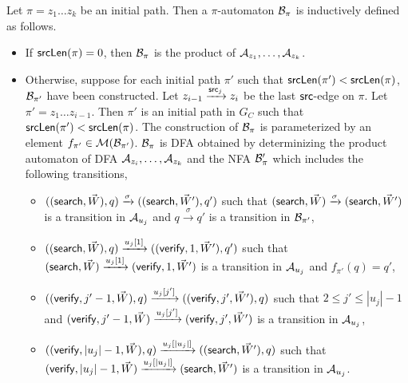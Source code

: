\documentclass{llncs}
\begin{document}
{\begin{definition}[$\pi$-automaton]\label{def-pi-aut}
Let $\pi=z_1 \dots z_k$ be an initial path.  Then a $\pi$-automaton $\mathcal{B}_\pi$ is inductively defined as follows.
\begin{itemize}
\item If $\mathsf{srcLen}(\pi)=0$, then $\mathcal{B}_\pi$ is the product of $\mathcal{A}_{z_1},\dots, \mathcal{A}_{z_k}$.
%
\item Otherwise, 
 suppose for each initial path $\pi'$ such that $\mathsf{srcLen}(\pi') < \mathsf{srcLen}(\pi)$, $\mathcal{B}_{\pi'}$ have been constructed.  
 Let $z_{i-1} \xrightarrow{\mathsf{src}_j} z_{i}$ be the last $\mathsf{src}$-edge on $\pi$. 
Let $\pi' = z_1\dots z_{i-1}$. Then $\pi'$ is an initial path in $G_C$ such that $\mathsf{srcLen}(\pi') < \mathsf{srcLen}(\pi)$. The construction of $\mathcal{B}_\pi$ is parameterized by an element $f_{\pi'} \in \mathcal{M}(\mathcal{B}_{\pi'})$. $\mathcal{B}_\pi$ is DFA obtained by determinizing the product automaton of DFA $\mathcal{A}_{z_i},\dots, \mathcal{A}_{z_k}$ and the NFA $\mathcal{B}'_{\pi}$ which includes the following transitions,
\begin{itemize}
\item $((\mathsf{search}, \vec{W}), q) \xrightarrow{\sigma} ((\mathsf{search}, \vec{W}'), q')$ such that $(\mathsf{search}, \vec{W}) \xrightarrow{\sigma} (\mathsf{search}, \vec{W}')$ is a transition in $\mathcal{A}_{u_j}$ and $q \xrightarrow{\sigma} q'$ is a transition in $\mathcal{B}_{\pi'}$,
\item $((\mathsf{search}, \vec{W}), q) \xrightarrow{u_j[1]} ((\mathsf{verify}, 1, \vec{W}'), q')$ such that  $(\mathsf{search}, \vec{W}) \xrightarrow{u_j[1]} (\mathsf{verify},1,  \vec{W}')$ is a transition in $\mathcal{A}_{u_j}$ and $f_{\pi'}(q)=q'$,
\item $((\mathsf{verify}, j'-1, \vec{W}), q) \xrightarrow{u_j[j']} ((\mathsf{verify}, j', \vec{W}'), q)$ such that $2 \le j' \le |u_j |-1$ and $(\mathsf{verify}, j'-1, \vec{W}) \xrightarrow{u_j[j']} (\mathsf{verify},j',  \vec{W}')$ is a transition in $\mathcal{A}_{u_j}$,
\item $((\mathsf{verify}, |u_j|-1, \vec{W}),q) \xrightarrow{u_j[|u_j|]} ((\mathsf{search}, \vec{W}'),q)$ such that $(\mathsf{verify}, |u_j|-1, \vec{W}) \xrightarrow{u_j[|u_j|]} (\mathsf{search}, \vec{W}')$ is a transition in $\mathcal{A}_{u_j}$.
\end{itemize}
\end{itemize}
\end{definition}
}
\end{document}
